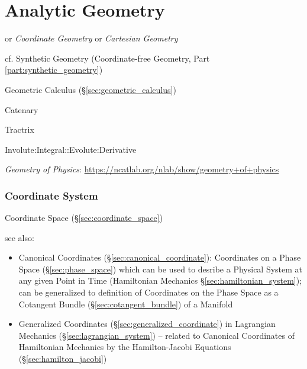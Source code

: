\part{Analytic Geometry}\label{part:analytic_geometry}

or \emph{Coordinate Geometry} or \emph{Cartesian Geometry}

\fist cf. Synthetic Geometry (Coordinate-free Geometry, Part
\ref{part:synthetic_geometry})

\fist Geometric Calculus (\S\ref{sec:geometric_calculus})

Catenary

Tractrix

Involute:Integral::Evolute:Derivative

\fist \emph{Geometry of Physics}:
\url{https://ncatlab.org/nlab/show/geometry+of+physics}



\section{Coordinate System}\label{sec:coordinate_system}

Coordinate Space (\S\ref{sec:coordinate_space})

see also:
\begin{itemize}
  \item Canonical Coordinates (\S\ref{sec:canonical_coordinate}): Coordinates on
    a Phase Space (\S\ref{sec:phase_space}) which can be used to desribe a
    Physical System at any given Point in Time (Hamiltonian Mechanics
    \S\ref{sec:hamiltonian_system}); can be generalized to definition of
    Coordinates on the Phase Space as a Cotangent Bundle
    (\S\ref{sec:cotangent_bundle}) of a Manifold
  \item Generalized Coordinates (\S\ref{sec:generalized_coordinate}) in
    Lagrangian Mechanics (\S\ref{sec:lagrangian_system}) -- related to Canonical
    Coordinates of Hamiltonian Mechanics by the Hamilton-Jacobi Equations
    (\S\ref{sec:hamilton_jacobi})
\end{itemize}

